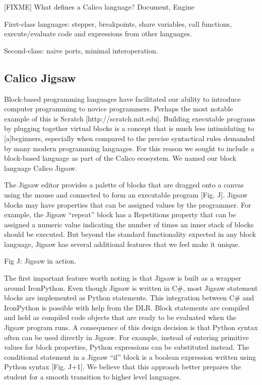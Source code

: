 \documentclass[preprint]{sigplanconf}
\begin{document}
[FIXME] What defines a Calico language? Document, Engine


First-class languages: stepper, breakpoints, share variables, call functions, execute/evaluate code and expressions from other languages. 


Second-class: naive ports, minimal interoperation.


\subsection{Calico Jigsaw}


Block-based programming languages have facilitated our ability to introduce computer programming to novice programmers. Perhaps the most notable example of this is Scratch [http://scratch.mit.edu]. Building executable programs by plugging together virtual blocks is a concept that is much less intimidating to [a]beginners, especially when compared to the precise syntactical rules demanded by many modern programming languages. For this reason we sought to include a block-based language as part of the Calico ecosystem. We named our block language Calico Jigsaw.


The Jigsaw editor provides a palette of blocks that are dragged onto a canvas using the mouse and connected to form an executable program [Fig. J]. Jigsaw blocks may have properties that can be assigned values by the programmer. For example, the Jigsaw ``repeat'' block has a Repetitions property that can be assigned a numeric value indicating the number of times an inner stack of blocks should be executed. But beyond the standard functionality expected in any block language, Jigsaw has several additional features that we feel make it unique.



Fig J: Jigsaw in action.


The first important feature worth noting is that Jigsaw is built as a wrapper around IronPython. Even though Jigsaw is written in C\#, most Jigsaw statement blocks are implemented as Python statements. This integration between C\# and IronPython is possible with help from the DLR. Block statements are compiled and held as compiled code objects that are ready to be evaluated when the Jigsaw program runs. A consequence of this design decision is that Python syntax often can be used directly in Jigsaw. For example, instead of entering primitive values for block properties, Python expressions can be substituted instead. The conditional statement in a Jigsaw ``if'' block is a boolean expression written using Python syntax [Fig. J+1]. We believe that this approach better prepares the student for a smooth transition to higher level languages.
\end{document}
